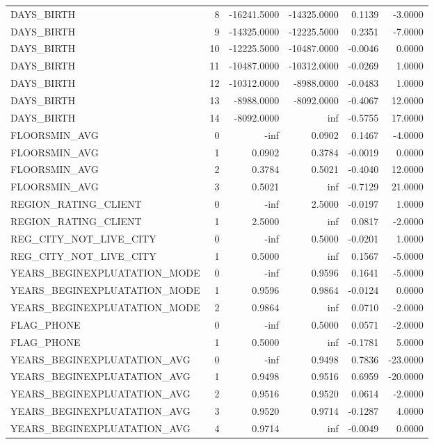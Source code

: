 \begin{tabular}{lrrrrr}
DAYS_BIRTH & 8 & -16241.5000 & -14325.0000 & 0.1139 & -3.0000 \\
DAYS_BIRTH & 9 & -14325.0000 & -12225.5000 & 0.2351 & -7.0000 \\
DAYS_BIRTH & 10 & -12225.5000 & -10487.0000 & -0.0046 & 0.0000 \\
DAYS_BIRTH & 11 & -10487.0000 & -10312.0000 & -0.0269 & 1.0000 \\
DAYS_BIRTH & 12 & -10312.0000 & -8988.0000 & -0.0483 & 1.0000 \\
DAYS_BIRTH & 13 & -8988.0000 & -8092.0000 & -0.4067 & 12.0000 \\
DAYS_BIRTH & 14 & -8092.0000 & inf & -0.5755 & 17.0000 \\
FLOORSMIN_AVG & 0 & -inf & 0.0902 & 0.1467 & -4.0000 \\
FLOORSMIN_AVG & 1 & 0.0902 & 0.3784 & -0.0019 & 0.0000 \\
FLOORSMIN_AVG & 2 & 0.3784 & 0.5021 & -0.4040 & 12.0000 \\
FLOORSMIN_AVG & 3 & 0.5021 & inf & -0.7129 & 21.0000 \\
REGION_RATING_CLIENT & 0 & -inf & 2.5000 & -0.0197 & 1.0000 \\
REGION_RATING_CLIENT & 1 & 2.5000 & inf & 0.0817 & -2.0000 \\
REG_CITY_NOT_LIVE_CITY & 0 & -inf & 0.5000 & -0.0201 & 1.0000 \\
REG_CITY_NOT_LIVE_CITY & 1 & 0.5000 & inf & 0.1567 & -5.0000 \\
YEARS_BEGINEXPLUATATION_MODE & 0 & -inf & 0.9596 & 0.1641 & -5.0000 \\
YEARS_BEGINEXPLUATATION_MODE & 1 & 0.9596 & 0.9864 & -0.0124 & 0.0000 \\
YEARS_BEGINEXPLUATATION_MODE & 2 & 0.9864 & inf & 0.0710 & -2.0000 \\
FLAG_PHONE & 0 & -inf & 0.5000 & 0.0571 & -2.0000 \\
FLAG_PHONE & 1 & 0.5000 & inf & -0.1781 & 5.0000 \\
YEARS_BEGINEXPLUATATION_AVG & 0 & -inf & 0.9498 & 0.7836 & -23.0000 \\
YEARS_BEGINEXPLUATATION_AVG & 1 & 0.9498 & 0.9516 & 0.6959 & -20.0000 \\
YEARS_BEGINEXPLUATATION_AVG & 2 & 0.9516 & 0.9520 & 0.0614 & -2.0000 \\
YEARS_BEGINEXPLUATATION_AVG & 3 & 0.9520 & 0.9714 & -0.1287 & 4.0000 \\
YEARS_BEGINEXPLUATATION_AVG & 4 & 0.9714 & inf & -0.0049 & 0.0000 \\

\end{tabular}
